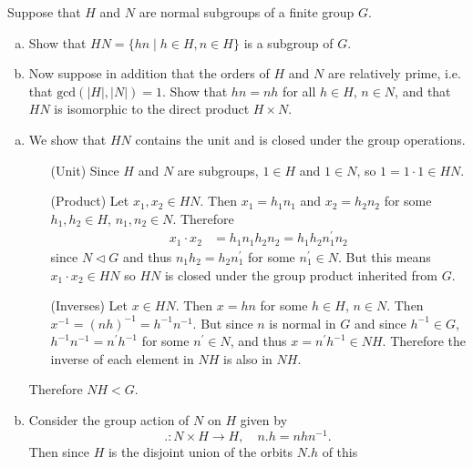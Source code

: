 \documentclass{article}
\newcounter{Problem}
\newenvironment{Problem}{\begin{Exercise}[name={Problem},
                                          counter={Problem}]}
                        {\end{Exercise}}
\begin{document}
\pagebreak

\begin{Problem}
Suppose that $H$ and $N$ are normal subgroups of a finite group $G$.
\begin{enumerate}[(a)]
  \item{Show that $HN = \{ hn \mid h \in H, n \in H \}$ 
        is a subgroup of $G$.}
  \item{Now suppose in addition that the orders of $H$ and $N$ are
      relatively prime, i.e. that $\mathrm{gcd}(|H|,|N|) = 1$. Show
      that $hn = nh$ for all $h \in H$, $n \in N$, and that $HN$ is
      isomorphic to the direct product $H \times N$.}
\end{enumerate}
\end{Problem}

\begin{Answer}
\begin{enumerate}[(a)]
  \item{We show that $HN$ contains the unit and is closed under the
      group operations.
  \begin{itemize}
    \item[(Unit)]
    {
      Since $H$ and $N$ are subgroups, $1 \in H$ and $1 \in N$, so
      $1 = 1 \cdot 1 \in HN$.
    }
    \item[(Product)]
    {
      Let $x_1, x_2 \in HN$. Then $x_1 = h_1 n_1$ and $x_2 = h_2 n_2$
      for some $h_1, h_2 \in H$, $n_1, n_2 \in N$. Therefore
      \begin{align*}
        x_1 \cdot x_2 &= h_1 n_1 h_2 n_2 = h_1 h_2 n_1^\prime n_2
      \end{align*}
      since $N \triangleleft G$ and thus $n_1 h_2 = h_2 n_1^\prime$
      for some $n_1^\prime \in N$. But this means $x_1 \cdot x_2 \in HN$ so
      $HN$ is closed under the group product inherited from $G$.
    }
    \item[(Inverses)]
    {
      Let $x \in HN$. Then $x = hn$ for some $h \in H$, $n \in N$.
      Then $x^{-1} = (nh)^{-1} = h^{-1} n^{-1}$. But since $n$ is
      normal in $G$ and since $h^{-1} \in G$, $h^{-1} n^{-1} =
      n^\prime h^{-1}$ for some $n^\prime \in N$, and thus
      $x = n^\prime h^{-1} \in NH$. Therefore the inverse of each
      element in $NH$ is also in $NH$.      
    }
  \end{itemize}
  Therefore $NH < G$.
  }
  \item
  {
    Consider the group action of $N$ on $H$ given by
    $$
    . : N \times H \to H, \quad 
    n . h = n h n^{-1}.
    $$
    Then since $H$ is the disjoint union of the orbits $N . h$ of this
}
\end{enumerate}
\end{Answer}
\end{document}
